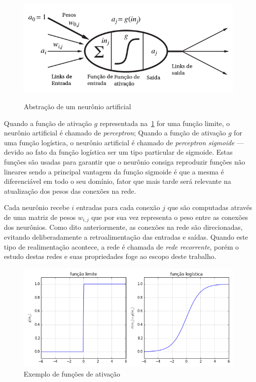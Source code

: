 \begin{figure}
  \caption{Abstração de um neurônio artificial}
  \begin{center}
    \includegraphics[width=\textwidth]{fig-001-ann}
  \end{center}
  \label{fig:001-ann}
\end{figure}

Quando a função de ativação $g$ representada na~\ref{fig:001-ann} for uma
função limite, o neurônio artificial é chamado de \emph{perceptron}; Quando a
função de ativação $g$ for uma função logística, o neurônio artificial é
chamado de \emph{perceptron sigmoide} --- devido ao fato da função logística
ser um tipo particular de sigmoide. Estas funções são usadas para garantir que
o neurônio consiga reproduzir funções não lineares sendo a principal vantagem da
função sigmoide é que a mesma é diferenciável em todo o seu domínio, fator que
mais tarde será relevante na atualização dos pesos das conexões na rede.

Cada neurônio recebe $i$ entradas para cada conexão $j$ que são computadas
através de uma matriz de pesos $w_{i,j}$ que por sua vez representa o peso
entre as conexões dos neurônios. Como dito anteriormente, as conexões na rede
são direcionadas, evitando deliberadamente a retroalimentação das entradas e
saídas. Quando este tipo de realimentação acontece, a rede é chamada de
\emph{rede recorrente}, porém o estudo destas redes e suas propriedades foge ao
escopo deste trabalho.

\begin{figure}
  \caption{Exemplo de funções de ativação}
  \begin{center}
    \includegraphics[width=\textwidth]{fig-002-threshold}
  \end{center}
\end{figure}

